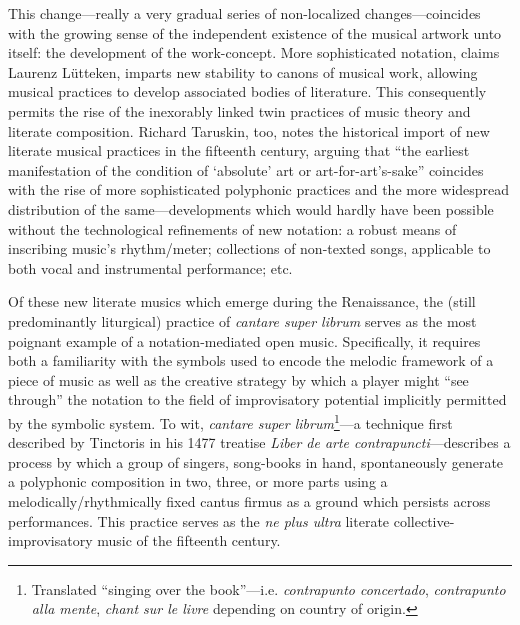     This change---really a very gradual series of non-localized changes---coincides with the growing sense of the independent existence of the musical artwork unto itself: the development of the work-concept. More sophisticated notation, claims Laurenz Lütteken, imparts new stability to canons of musical work, allowing musical practices to develop associated bodies of literature. This consequently permits the rise of the inexorably linked twin practices of music theory and literate composition.\autocite[57]{Lutteken_2020} Richard Taruskin, too, notes the historical import of new literate musical practices in the fifteenth century, arguing that ``the earliest manifestation of the condition of `absolute' art or art-for-art's-sake'' coincides with the rise of more sophisticated polyphonic practices and the more widespread distribution of the same---developments which would hardly have been possible without the technological refinements of new notation: a robust means of inscribing music's rhythm/meter; collections of non-texted songs, applicable to both vocal and instrumental performance; etc.\autocite[541]{Taruskin_2009}

    Of these new literate musics which emerge during the Renaissance, the (still predominantly liturgical) practice of \textit{cantare super librum} serves as the most poignant example of a notation-mediated open music. Specifically, it requires both a familiarity with the symbols used to encode the melodic framework of a piece of music as well as the creative strategy by which a player might ``see through'' the notation to the field of improvisatory potential implicitly permitted by the symbolic system. To wit, \textit{cantare super librum}\footnote{Translated ``singing over the book''---i.e. \textit{contrapunto concertado}, \textit{contrapunto alla mente}, \textit{chant sur le livre} depending on country of origin.}---a technique first described by Tinctoris in his 1477 treatise \textit{Liber de arte contrapuncti}---describes a process by which a group of singers, song-books in hand, spontaneously generate a polyphonic composition in two, three, or more parts using a melodically/rhythmically fixed cantus firmus as a ground which persists across performances. This practice serves as the \textit{ne plus ultra} literate collective-improvisatory music of the fifteenth century. 


